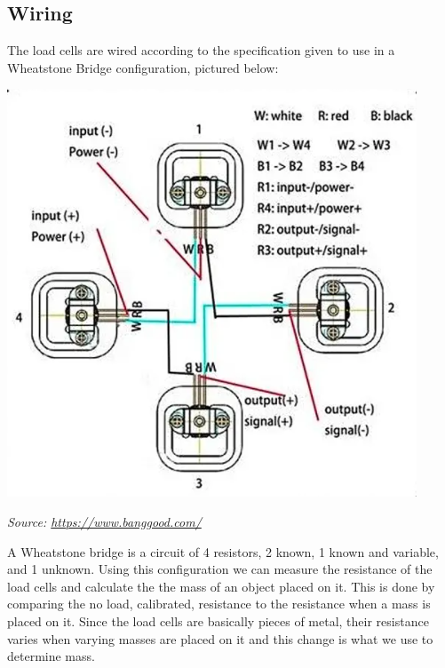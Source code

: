 \documentclass[10pt]{article}
\begin{document}
{\large
{\large\subsection{Wiring}\par}
The load cells are wired according to the specification given to use in a Wheatstone Bridge configuration, pictured below:

{\center\includegraphics[scale=.5]{loadcellwiring}\par}
{\textit{Source: \href{https://www.banggood.com/4pcs-DIY-50KG-Body-Load-Cell-Weight-Strain-Sensor-Resistance-With-HX711-AD-Module-p-1326815.html?utm_source=googleshopping&utm_medium=cpc_organic&gmcCountry=US&utm_content=shopping&utm_campaign=us-pc&currency=USD&createTmp=1&utm_source=googleshopping&utm_medium=cpc_bgs&utm_content=frank&utm_campaign=frank-ssc-us-toys-tool-ele-newcustom-ncv80-0116&ad_id=411455834827&gclid=Cj0KCQjwy6T1BRDXARIsAIqCTXpl9vvx29pgQ5I5bO3OfoMXg4CrioA-04iYSjtnyxtn5z5hVLJjgT4aAulwEALw_wcB&cur_warehouse=CN}{https://www.banggood.com/}}}

A Wheatstone bridge is a circuit of 4 resistors, 2 known, 1 known and variable, and 1 unknown. Using this configuration we can measure the resistance of the load cells and calculate the the mass of an object placed on it. This is done by comparing the no load, calibrated, resistance to the resistance when a mass is placed on it. Since the load cells are basically pieces of metal, their resistance varies when varying masses are placed on it and this change is what we use to determine mass.

}
\end{document}

